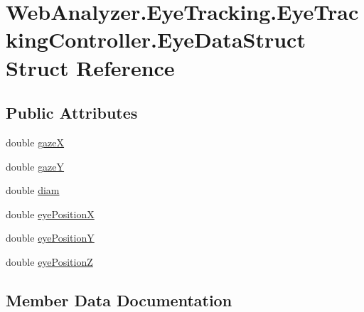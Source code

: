 \hypertarget{struct_web_analyzer_1_1_eye_tracking_1_1_eye_tracking_controller_1_1_eye_data_struct}{}\section{Web\+Analyzer.\+Eye\+Tracking.\+Eye\+Tracking\+Controller.\+Eye\+Data\+Struct Struct Reference}
\label{struct_web_analyzer_1_1_eye_tracking_1_1_eye_tracking_controller_1_1_eye_data_struct}
\subsection*{Public Attributes}
\begin{DoxyCompactItemize}
\item 
double \hyperlink{struct_web_analyzer_1_1_eye_tracking_1_1_eye_tracking_controller_1_1_eye_data_struct_acaec5f71896bd916a0a3f1a49a1d9091}{gaze\+X}
\item 
double \hyperlink{struct_web_analyzer_1_1_eye_tracking_1_1_eye_tracking_controller_1_1_eye_data_struct_af906fc37767cfe35becb556afb6242f6}{gaze\+Y}
\item 
double \hyperlink{struct_web_analyzer_1_1_eye_tracking_1_1_eye_tracking_controller_1_1_eye_data_struct_a9f0ed2c376e8f361ca53e19819c5e038}{diam}
\item 
double \hyperlink{struct_web_analyzer_1_1_eye_tracking_1_1_eye_tracking_controller_1_1_eye_data_struct_ad5af7932058d68432d27fa068b835489}{eye\+Position\+X}
\item 
double \hyperlink{struct_web_analyzer_1_1_eye_tracking_1_1_eye_tracking_controller_1_1_eye_data_struct_a43b34142da54c24956d1dc58672a04bb}{eye\+Position\+Y}
\item 
double \hyperlink{struct_web_analyzer_1_1_eye_tracking_1_1_eye_tracking_controller_1_1_eye_data_struct_a6f66c9c36a4218d94bdd6fb4a4a033b6}{eye\+Position\+Z}
\end{DoxyCompactItemize}


\subsection{Member Data Documentation}
\hypertarget{struct_web_analyzer_1_1_eye_tracking_1_1_eye_tracking_controller_1_1_eye_data_struct_a9f0ed2c376e8f361ca53e19819c5e038}{}
